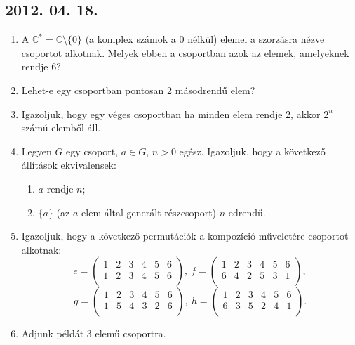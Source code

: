 \documentclass{article}
\newenvironment{abc}{\begin{enumerate}[label=\textit{\alph*})]}{\end{enumerate}}
\begin{document}
\subsection*{2012. 04. 18.}
\begin{enumerate}
\item A $\mathbb{C}^{*}=\mathbb{C}\setminus\{0\}$ (a komplex számok a 0 nélkül) elemei a szorzásra nézve csoportot alkotnak. Melyek ebben a csoportban azok az elemek, amelyeknek rendje 6?
\item Lehet-e egy csoportban pontosan 2 másodrendű elem?
\item Igazoljuk, hogy egy véges csoportban ha minden elem rendje 2, akkor $2^n$ számú elemből áll.
\item Legyen $G$ egy csoport, $a\in G$, $n>0$ egész. Igazoljuk, hogy a következő állítások ekvivalensek:
\begin{abc}
\item $a$ rendje $n$;
\item $\{a\}$ (az $a$ elem által generált részcsoport) $n$-edrendű.
\end{abc}
\item Igazoljuk, hogy a következő permutációk a kompozíció műveletére csoportot alkotnak:
\[e=\left(\begin{matrix}
1&2&3&4&5&6\\
1&2&3&4&5&6\\
\end{matrix}\right),~
f=\left(\begin{matrix}
1&2&3&4&5&6\\
6&4&2&5&3&1\\
\end{matrix}\right),\]
\[g=\left(\begin{matrix}
1&2&3&4&5&6\\
1&5&4&3&2&6\\
\end{matrix}\right),~
h=\left(\begin{matrix}
1&2&3&4&5&6\\
6&3&5&2&4&1\\
\end{matrix}\right).\]
\item Adjunk példát 3 elemű csoportra.
\end{enumerate}
\end{document}
